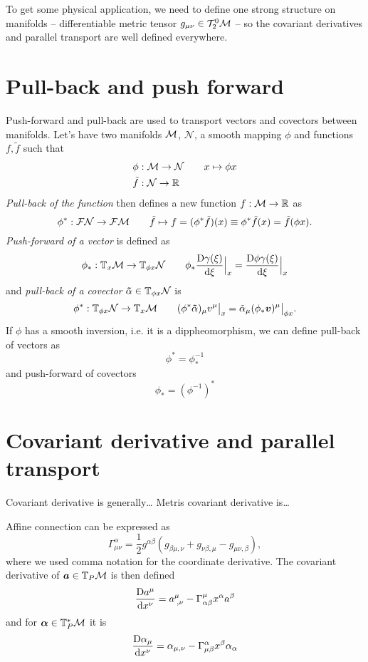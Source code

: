 To get some physical application, we need to define one strong structure on manifolds -- differentiable metric tensor $g_{\mu\nu}\in\mathcal{T}^0_2\mathcal{M}$ -- so the covariant derivatives and parallel transport are well defined everywhere. 


\section{Pull-back and push forward}
Push-forward and pull-back are used to transport vectors and covectors between manifolds. Let's have two manifolds $\mathcal{M}$, $\mathcal{N}$, a smooth mapping $\phi$ and functions $f,\tilde f$ such that
\begin{align*}
    \phi&:\mathcal{M}\rightarrow \mathcal{N}\qquad x\mapsto \phi x\\
    \tilde f&:\mathcal{N}\rightarrow \mathbb{R} 
\end{align*}
\emph{Pull-back of the function} then defines a new function $
f:\mathcal{M}\rightarrow \mathbb{R} $ as
$$\phi^*:\mathcal{F} \mathcal{N}\rightarrow \mathcal{F}\mathcal{M} \qquad  \tilde f\mapsto f=(\phi^*\tilde f)(x)\equiv \phi^*\tilde f(x) =\tilde f(\phi x).$$
\emph{Push-forward of a vector} is defined as
$$\phi_*: \mathbb{T}_x\mathcal{M} \rightarrow \mathbb{T}_{\phi x}\mathcal N\qquad \phi_* 
\frac{\mathrm{D} \gamma(\xi)}{\mathrm{d} \xi}\Big|_x=\frac{\mathrm{D} \phi \gamma(\xi)}{\mathrm{d} \xi}\Big|_x$$
and \emph{pull-back of a covector} $\bm\tilde\alpha\in \mathbb{T}_{\phi x}\mathcal N$ is
$$\phi^*: \mathbb{T}_{\phi x}\mathcal N\rightarrow \mathbb{T}_x\mathcal{M}  \qquad (\phi^*\bm \tilde\alpha)_\mu v^\mu\big|_x= \tilde\alpha_\mu (\phi_* \bm v)^\mu\big|_{\phi x}.$$
If $\phi$ has a smooth inversion, i.e. it is a dippheomorphism, we can define pull-back of vectors as
\begin{equation}
    \phi^*=\phi_*^{-1}
\end{equation}
and push-forward of covectors
\begin{equation}
    \phi_*=(\phi^{-1})^*
\end{equation}

\section{Covariant derivative and parallel transport}
Covariant derivative is generally\dots
Metris covariant derivative is\dots


Affine connection can be expressed as
\begin{equation}
    \Gamma^{\alpha}_{\mu\nu} = \frac{1}{2}g^{\alpha \beta}\left(g_{\beta\mu,\nu}+g_{\nu\beta,\mu}-g_{\mu\nu,\beta}\right),
\end{equation}
where we used comma notation for the coordinate derivative.
The covariant derivative of $\bm a\in \mathbb{T}_P\mathcal{M}$ is then defined
\begin{equation}
    \frac{\mathrm{D} a^\mu}{\mathrm{d} x^\nu}=a_{\;,\nu}^\mu-\Gamma^\mu_{\alpha\beta} x^\alpha a^\beta 
\end{equation}
and for $\bm\alpha\in \mathbb{T}_P^*\mathcal{M}$ it is
\begin{equation}
    \frac{\mathrm{D} \alpha_\mu}{\mathrm{d} x^\nu}=\alpha_{\mu,\nu}-\Gamma^\alpha_{\mu\beta}x^\beta \alpha_\alpha 
\end{equation}

